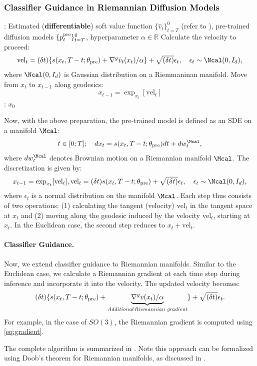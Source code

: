 \subsubsection{Classifier Guidance in Riemannian Diffusion Models}

\begin{algorithm}[!th]
\caption{Classifier Guidance in Riemannian Diffusion Models  }\label{alg:deri_rie}
\begin{algorithmic}[1]
     : Estimated (\textbf{differentiable}) soft value function $\{\hat v_t\}_{t=T}^0$ (refer to ), pre-trained diffusion models $\{p^{\mathrm{pre}}_t\}_{t=T}^0$, hyperparameter $\alpha \in \mathbb{R}$ 
     \STATE Calculate the velocity to proceed:
     \begin{align*}
 \textstyle  \mathrm{vel}_t=(\delta t)\{ s(x_t, T-t; \theta_{\pre}) + \nabla^{g} \hat v_t(x_t)/\alpha\}  + \sqrt{(\delta t)}\epsilon_t, \quad \epsilon_t\sim {\Ncal(0,I_{d})},         
     \end{align*}
     where $\Ncal(0,I_d)$ is Gaussian distribution on a Riemmaninan manifold. 
        \STATE Move from $x_t$ to $x_{t-1}$ along geodesics: $$  \textstyle    x_{t-1}= \exp_{x_t}[\mathrm{vel}_t] $$
     \ENDFOR
  : $x_0$
\end{algorithmic}
\end{algorithm}

Now, with the above preparation, the pre-trained model is defined as an SDE on a manifold $\Mcal$:
\begin{align*}
    t \in [0;T];\quad d x_t = s(x_t, T-t; \theta_{\pre})  dt + dw^{\Mcal}_t, 
\end{align*}
where $dw^{\Mcal}_t$ denotes Brownian motion on a Riemannian manifold $\Mcal$. The discretization is given by:
\begin{align*}
    x_{t-1}= \exp_{x_t}[\mathrm{vel}_t], \mathrm{vel}_t=(\delta t)s(x_t, T-t; \theta_{\pre}) + \sqrt{(\delta t)}\epsilon_t, \quad \epsilon_t\sim \Ncal(0,I_{d}),
\end{align*}
where $\epsilon_t$ is a normal distribution on the manifold $\Mcal$. Each step thus consists of two operations: (1) calculating the tangent (velocity) $\mathrm{vel}_t$ in the tangent space at $x_t$ and (2) moving along the geodesic induced by the velocity $\mathrm{vel}_t$, starting at $x_t$. In the Euclidean case, the second step reduces to $x_t +\mathrm{vel}_t$. 

\paragraph{Classifier Guidance.} Now, we extend classifier guidance to Riemannian manifolds. Similar to the Euclidean case, we calculate a Riemannian gradient at each time step during inference and incorporate it into the velocity. The updated velocity becomes:
\begin{align*}
    (\delta t) \{ s(x_t, T-t; \theta_{\mathrm{pre}}) + \underbrace{\nabla^g  v(x_t)/\alpha}_{\textit{Additional\,Riemannian gradient}} \}  + \sqrt{(\delta t)}\epsilon_t. 
\end{align*}
For example, in the case of $SO(3)$, the Riemannian gradient is computed using \eqref{eq:gradient}. 

The complete algorithm is summarized in . Note this approach can be formalized using Doob's theorem for Riemannian manifolds, as discussed in . 

